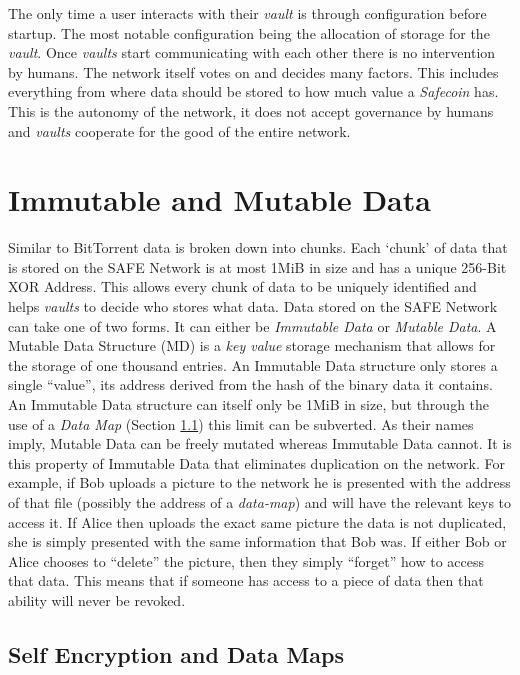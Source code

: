 The only time a user interacts with their \textit{vault} is through configuration before startup. The most notable configuration being the allocation of storage for the \textit{vault}. Once \textit{vaults} start communicating with each other there is no intervention by humans. The network itself votes on and decides many factors. This includes everything from where data should be stored to how much value a \textit{Safecoin} has. This is the autonomy of the network, it does not accept governance by humans and \textit{vaults} cooperate for the good of the entire network.

\section{Immutable and Mutable Data}

Similar to BitTorrent data is broken down into chunks. Each `chunk' of data that is stored on the SAFE Network is at most 1MiB in size and has a unique 256-Bit XOR Address. This allows every chunk of data to be uniquely identified and helps \textit{vaults} to decide who stores what data. Data stored on the SAFE Network can take one of two forms. It can either be \textit{Immutable Data} or \textit{Mutable Data}. A Mutable Data Structure (MD) is a \textit{key value} storage mechanism that allows for the storage of one thousand entries. An Immutable Data structure only stores a single ``value'', its address derived from the hash of the binary data it contains. An Immutable Data structure can itself only be 1MiB in size, but through the use of a \textit{Data Map} (Section \ref{subsec:self-encryption-data-map}) this limit can be subverted. As their names imply, Mutable Data can be freely mutated whereas Immutable Data cannot. It is this property of Immutable Data that eliminates duplication on the network. For example, if Bob uploads a picture to the network he is presented with the address of that file (possibly the address of a \textit{data-map}) and will have the relevant keys to access it. If Alice then uploads the exact same picture the data is not duplicated, she is simply presented with the same information that Bob was. If either Bob or Alice chooses to ``delete'' the picture, then they simply ``forget'' how to access that data. This means that if someone has access to a piece of data then that ability will never be revoked.

\subsection{Self Encryption and Data Maps}
\label{subsec:self-encryption-data-map}

